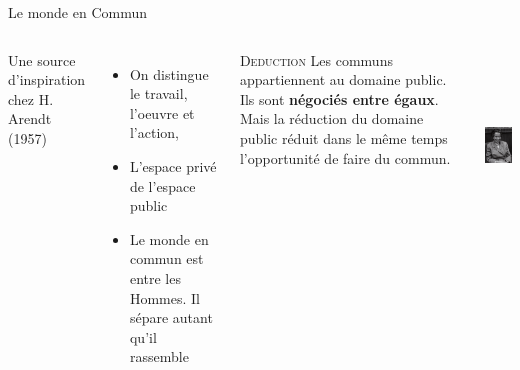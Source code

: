 \documentclass[newPxFont]{beamer}
\begin{document}
\begin{frame}[c]{Le monde en Commun}
  \vspace{-1cm}
  \begin{columns}[onlytextwidth,T]
    \column{\dimexpr\linewidth-30mm-5mm}
      Une source d'inspiration chez H. Arendt (1957)
      \begin{itemize}
        \item On distingue le travail, l'oeuvre et l'action, 
        \item L'espace privé de l'espace public
        \item Le monde en commun est entre les Hommes. Il sépare autant qu'il rassemble
      \end{itemize}
  
    \small{
      \begin{alertblock}{\textsc{Deduction}}
        Les communs appartiennent au domaine public. Ils sont \textbf{négociés entre égaux}. Mais la réduction du domaine public réduit dans le même temps l’opportunité de faire du commun.
      \end{alertblock}
    }
  \column{30mm}
    \includegraphics[height=5cm]{img/Hannah_Arendt.jpg}
    \end{columns}
  \end{frame}
\end{document}
